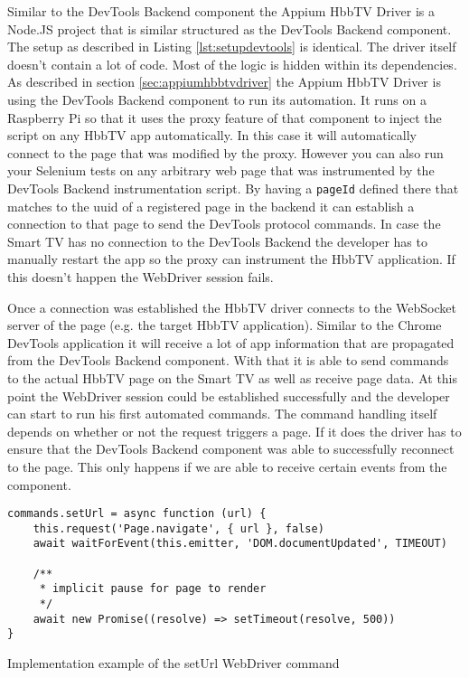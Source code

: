 Similar to the DevTools Backend component the Appium HbbTV Driver is a Node.JS project that is similar structured as the DevTools Backend component. The setup as described in Listing \ref{lst:setupdevtools} is identical. The driver itself doesn't contain a lot of code. Most of the logic is hidden within its dependencies. As described in section \ref{sec:appiumhbbtvdriver} the Appium HbbTV Driver is using the DevTools Backend component to run its automation. It runs on a Raspberry Pi so that it uses the proxy feature of that component to inject the script on any HbbTV app automatically. In this case it will automatically connect to the page that was modified by the proxy. However you can also run your Selenium tests on any arbitrary web page that was instrumented by the DevTools Backend instrumentation script. By having a \texttt{pageId} defined there that matches to the uuid of a registered page in the backend it can establish a connection to that page to send the DevTools protocol commands. In case the Smart TV has no connection to the DevTools Backend the developer has to manually restart the app so the proxy can instrument the HbbTV application. If this doesn't happen the WebDriver session fails.

Once a connection was established the HbbTV driver connects to the WebSocket server of the page (e.g. the target HbbTV application). Similar to the Chrome DevTools application it will receive a lot of app information that are propagated from the DevTools Backend component. With that it is able to send commands to the actual HbbTV page on the Smart TV as well as receive page data. At this point the WebDriver session could be established successfully and the developer can start to run his first automated commands. The command handling itself depends on whether or not the request triggers a page. If it does the driver has to ensure that the DevTools Backend component was able to successfully reconnect to the page. This only happens if we are able to receive certain events from the component.

\begin{listing}[H]
\begin{verbatim}
commands.setUrl = async function (url) {
    this.request('Page.navigate', { url }, false)
    await waitForEvent(this.emitter, 'DOM.documentUpdated', TIMEOUT)

    /**
     * implicit pause for page to render
     */
    await new Promise((resolve) => setTimeout(resolve, 500))
}
\end{verbatim}
\caption{Implementation example of the setUrl WebDriver command}
\label{lst:setUrl}
\end{listing}

